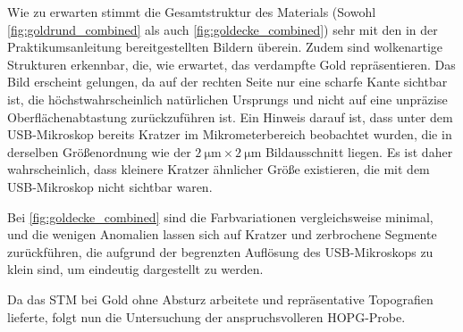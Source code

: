 Wie zu erwarten stimmt die Gesamtstruktur des Materials (Sowohl \cref{fig:goldrund_combined} als auch \cref{fig:goldecke_combined}) sehr mit den in der Praktikumsanleitung \cite{praktikum} bereitgestellten Bildern überein.
Zudem sind wolkenartige Strukturen erkennbar, die, wie erwartet, das verdampfte Gold repräsentieren. 
Das Bild erscheint gelungen, da auf der rechten Seite nur eine scharfe Kante sichtbar ist, die höchstwahrscheinlich natürlichen Ursprungs und nicht auf eine unpräzise Oberflächenabtastung zurückzuführen ist. 
Ein Hinweis darauf ist, dass unter dem USB-Mikroskop bereits Kratzer im Mikrometerbereich beobachtet wurden, die in derselben Größenordnung wie der $\SI{2}{\micro\metre} \times \SI{2}{\micro\metre}$ Bildausschnitt liegen. 
Es ist daher wahrscheinlich, dass kleinere Kratzer ähnlicher Größe existieren, die mit dem USB-Mikroskop nicht sichtbar waren.


Bei \cref{fig:goldecke_combined} sind die Farbvariationen vergleichsweise minimal, und die wenigen Anomalien lassen sich auf Kratzer und zerbrochene Segmente zurückführen, die aufgrund der begrenzten Auflösung des USB-Mikroskops zu klein sind, um eindeutig dargestellt zu werden.


Da das STM bei Gold ohne Absturz arbeitete und repräsentative Topografien lieferte, folgt nun die Untersuchung der anspruchsvolleren HOPG-Probe.
